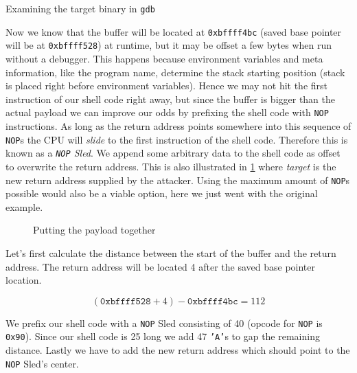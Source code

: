 \documentclass[article]{uibk}
\begin{document}
\begin{listing}[h!]
    \begin{minipage}[t]{0.4\textwidth}
    \end{minipage}\hfill
    \begin{minipage}[t]{0.5\textwidth}
    \end{minipage}
    \caption{Examining the target binary in \texttt{gdb}}
    \label{src:shell_code2}
\end{listing}

Now we know that the buffer will be located at \texttt{0xbffff4bc} (saved base
pointer will be at \texttt{0xbffff528}) at runtime, but it may be offset a few
bytes when run without a debugger. This happens because environment variables
and meta information, like the program name, determine the stack starting
position (stack is placed right before environment variables). Hence we may not
hit the first instruction of our shell code right away, but since the buffer is
bigger than the actual payload we can improve our odds by prefixing the shell
code with \texttt{NOP} instructions. As long as the return address points
somewhere into this sequence of \texttt{NOP}s the CPU will \emph{slide} to the
first instruction of the shell code. Therefore this is known as a
\textit{\texttt{NOP} Sled}. We append some arbitrary data to the shell code as
offset to overwrite the return address. This is also illustrated in
\cref{fig:shell_code} where \textit{target} is the new return address supplied
by the attacker. Using the maximum amount of \texttt{NOP}s possible would also
be a viable option, here we just went with the original example.

\begin{figure}[H]
    \centering
    
    \caption{Putting the payload together}
    \label{fig:shell_code}
\end{figure}

Let's first calculate the distance between the start of the buffer and the
return address. The return address will be located \SI{4}{\byte} after the
saved base pointer location.

\[(\texttt{0xbffff528} + 4) - \texttt{0xbffff4bc} = 112\]

We prefix our shell code with a \texttt{NOP} Sled consisting of \SI{40}{\byte}
(opcode for \texttt{NOP} is \texttt{0x90}). Since our shell code is \SI{25}{\byte}
long we add 47 \texttt{'A'}s to gap the remaining distance. Lastly we have to add
the new return address which should point to the \texttt{NOP} Sled's center.
\end{document}
